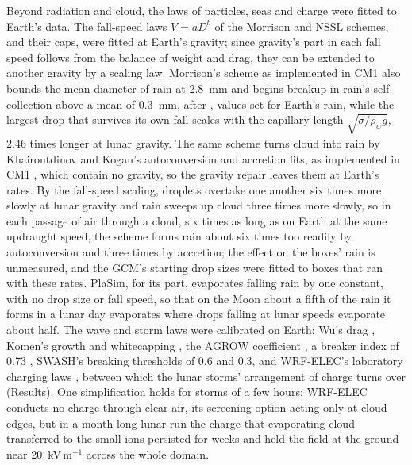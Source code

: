 Beyond radiation and cloud, the laws of particles, seas and charge were fitted to Earth's data. The fall-speed laws $V =
aD^b$ of the Morrison and NSSL schemes, and their caps, were fitted at Earth's gravity; since gravity's part in
each fall speed follows from the balance of weight and drag, they can be extended to another gravity by a scaling law. Morrison's scheme as implemented in CM1 \autocite{morrison2005new} also bounds the mean
diameter of rain at 2.8~mm and begins breakup in rain's self-collection above a mean of 0.3~mm, after
\textcite{verlinde1993fitting}, values set for Earth's rain, while the largest drop that survives its own fall
scales with the capillary length $\sqrt{\sigma/\rho_w g}$, 2.46 times longer at lunar gravity. The
same scheme turns cloud into rain by Khairoutdinov and Kogan's autoconversion and accretion fits, as implemented in
CM1 \autocite{bryan2026cm1}, which contain no gravity, so the gravity repair leaves them at Earth's rates. By the
fall-speed scaling, droplets overtake one another six times more slowly at lunar gravity and rain sweeps up cloud
three times more slowly, so in each passage of air through a cloud, six times as long as on Earth at the same
updraught speed, the scheme forms rain about six times too readily by autoconversion and three times by accretion;
the effect on the boxes' rain is unmeasured, and the GCM's starting drop sizes were fitted to boxes that ran with
these rates. PlaSim,
for its part, evaporates falling rain by one constant, with no drop size or fall speed, so that on the Moon about a
fifth of the rain it forms in a lunar day evaporates where drops falling at lunar speeds evaporate about
half. The wave and storm laws were calibrated on Earth: Wu's drag \autocite{wu1982wind}, Komen's growth and whitecapping
\autocite{komen1984existence}, the AGROW coefficient \autocite{cavaleri1981wind}, a breaker index of 0.73
\autocite{battjes1985calibration}, SWASH's breaking thresholds of 0.6 and 0.3, and WRF-ELEC's laboratory charging
laws \autocite{saunders1998laboratory,takahashi1978riming}, between which the lunar storms' arrangement of charge
turns over (Results). One simplification holds for storms of a few hours:
WRF-ELEC conducts no charge through clear air, its screening option acting only at cloud edges, but in a month-long
lunar run the charge that evaporating cloud transferred to the small ions persisted for weeks and held the field at the
ground near 20~kV\,m$^{-1}$ across the whole domain.

